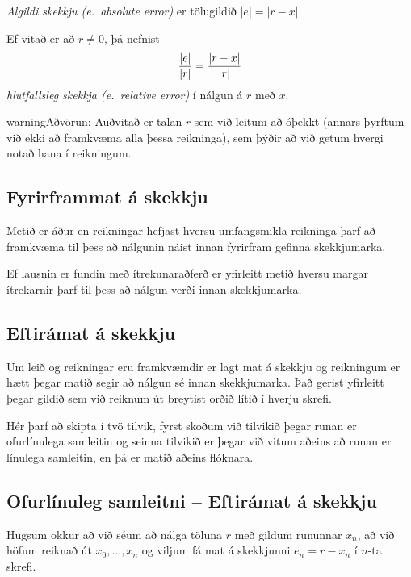 \documentclass[A4paper,10pt,icelandic]{sphinxmanual}
\begin{document}
\emph{Algildi skekkju (e. absolute error)} er tölugildið \(|e|=|r-x|\)

Ef vitað er að \(r\neq 0\), þá nefnist
\begin{gather}
\begin{split}\dfrac{|e|}{|r|}=\dfrac{|r-x|}{|r|}\end{split}\notag
\end{gather}
\emph{hlutfallsleg skekkja (e. relative error)} í nálgun á \(r\) með
\(x\).

\begin{notice}{warning}{Aðvörun:}
Auðvitað er talan \(r\) sem við leitum að óþekkt (annars
þyrftum við ekki að framkvæma alla þessa reikninga), sem þýðir að við
getum hvergi notað hana í reikningum.
\end{notice}


\subsection{Fyrirframmat á skekkju}
\label{kafli01:fyrirframmat-a-skekkju}\label{kafli01:index-6}
Metið er áður en reikningar hefjast hversu umfangsmikla reikninga þarf
að framkvæma til þess að nálgunin náist innan fyrirfram gefinna
skekkjumarka.

Ef lausnin er fundin með ítrekunaraðferð er yfirleitt metið hversu
margar ítrekarnir þarf til þess að nálgun verði innan skekkjumarka.


\subsection{Eftirámat á skekkju}
\label{kafli01:index-7}\label{kafli01:eftiramat-a-skekkju}
Um leið og reikningar eru framkvæmdir er lagt mat á skekkju og
reikningum er hætt þegar matið segir að nálgun sé innan skekkjumarka.
Það gerist yfirleitt þegar gildið sem við reiknum út breytist orðið
lítið í hverju skrefi.

Hér þarf að skipta í tvö tilvik, fyrst skoðum við tilvikið þegar runan er ofurlínulega samleitin
og seinna tilvikið er þegar við vitum aðeins að runan er línulega samleitin, en
þá er matið aðeins flóknara.


\subsection{Ofurlínuleg samleitni -- Eftirámat á skekkju}
\label{kafli01:ofurlinuleg-samleitni-eftiramat-a-skekkju}\label{kafli01:index-8}
Hugsum okkur að við séum að nálga töluna \(r\) með gildum rununnar
\(x_n\), að við höfum reiknað út \(x_0,\dots,x_n\) og viljum fá
mat á skekkjunni \(e_n=r-x_n\) í \(n\)-ta skrefi.
\end{document}
